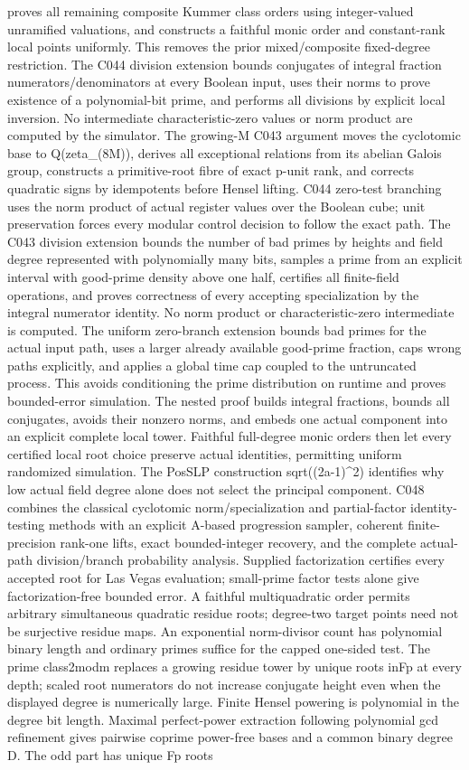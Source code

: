 proves all remaining composite Kummer class orders using integer-valued unramified valuations, and constructs a faithful monic order and constant-rank local points uniformly. This removes the prior mixed/composite fixed-degree restriction. The C044 division extension bounds conjugates of integral fraction numerators/denominators at every Boolean input, uses their norms to prove existence of a polynomial-bit prime, and performs all divisions by explicit local inversion. No intermediate characteristic-zero values or norm product are computed by the simulator. The growing-M C043 argument moves the cyclotomic base to Q(zeta\_(8M)), derives all exceptional relations from its abelian Galois group, constructs a primitive-root fibre of exact p-unit rank, and corrects quadratic signs by idempotents before Hensel lifting. C044 zero-test branching uses the norm product of actual register values over the Boolean cube; unit preservation forces every modular control decision to follow the exact path. The C043 division extension bounds the number of bad primes by heights and field degree represented with polynomially many bits, samples a prime from an explicit interval with good-prime density above one half, certifies all finite-field operations, and proves correctness of every accepting specialization by the integral numerator identity. No norm product or characteristic-zero intermediate is computed. The uniform zero-branch extension bounds bad primes for the actual input path, uses a larger already available good-prime fraction, caps wrong paths explicitly, and applies a global time cap coupled to the untruncated process. This avoids conditioning the prime distribution on runtime and proves bounded-error simulation. The nested proof builds integral fractions, bounds all conjugates, avoids their nonzero norms, and embeds one actual component into an explicit complete local tower. Faithful full-degree monic orders then let every certified local root choice preserve actual identities, permitting uniform randomized simulation. The PosSLP construction sqrt((2a-1)\textasciicircum{}2) identifies why low actual field degree alone does not select the principal component. C048 combines the classical cyclotomic norm/specialization and partial-factor identity-testing methods with an explicit A-based progression sampler, coherent finite-precision rank-one lifts, exact bounded-integer recovery, and the complete actual-path division/branch probability analysis. Supplied factorization certifies every accepted root for Las Vegas evaluation; small-prime factor tests alone give factorization-free bounded error. A faithful multiquadratic order permits arbitrary simultaneous quadratic residue roots; degree-two target points need not be surjective residue maps. An exponential norm-divisor count has polynomial binary length and ordinary primes suffice for the capped one-sided test. The prime class2modm replaces a growing residue tower by unique roots inFp at every depth; scaled root numerators do not increase conjugate height even when the displayed degree is numerically large. Finite Hensel powering is polynomial in the degree bit length. Maximal perfect-power extraction following polynomial gcd refinement gives pairwise coprime power-free bases and a common binary degree D. The odd part has unique Fp roots 